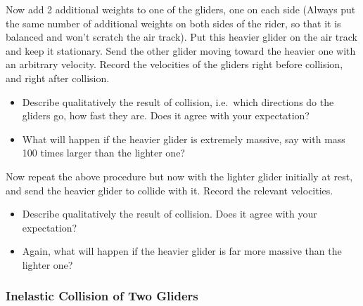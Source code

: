 Now add 2 additional weights to one of the gliders, one on each side (Always put the same number of additional weights on both sides of the rider, so that it is balanced and won't scratch the air track). Put this heavier glider on the air track and keep it stationary. Send the other glider moving toward the heavier one with an arbitrary velocity. Record the velocities of the gliders right before collision, and right after collision.
\begin{itemize}
    \item Describe qualitatively the result of collision, i.e.\ which directions do the gliders go, how fast they are. Does it agree with your expectation?
    \item What will happen if the heavier glider is extremely massive, say with mass 100 times larger than the lighter one?
\end{itemize}

Now repeat the above procedure but now with the lighter glider initially at rest, and send the heavier glider to collide with it. Record the relevant velocities.
\begin{itemize}
    \item Describe qualitatively the result of collision. Does it agree with your expectation?
    \item Again, what will happen if the heavier glider is far more massive than the lighter one?
\end{itemize}

\subsubsection{Inelastic Collision of Two Gliders}

